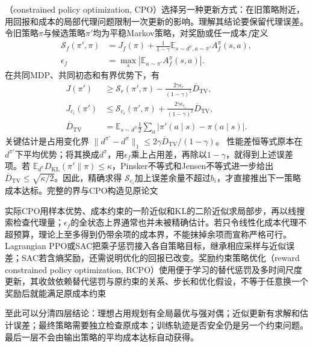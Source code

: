 （constrained policy optimization, CPO）选择另一种更新方式：在旧策略附近，用回报和成本的局部代理问题限制一次更新的影响。理解其结论要保留代理误差。令旧策略$\pi$与候选策略$\pi'$均为平稳Markov策略，对奖励或任一成本$f$定义
\[
  \begin{aligned}
    \mathcal S_f(\pi',\pi)
      &=J_f(\pi)+\frac{1}{1-\gamma}
          \mathbb E_{s\sim d^\pi,a\sim\pi'}A_f^\pi(s,a),\\
    \epsilon_f
      &=\max_s\left|\mathbb E_{a\sim\pi'}A_f^\pi(s,a)\right|.
  \end{aligned}
\]
在共同MDP、共同初态和有界优势下，有
\begin{align}
  J(\pi')&\geq\mathcal S_r(\pi',\pi)
      -\frac{2\gamma\epsilon_r}{(1-\gamma)^2}\overline D_{\mathrm{TV}},
      \nonumber\\
  J_{c_i}(\pi')&\leq\mathcal S_{c_i}(\pi',\pi)
      +\frac{2\gamma\epsilon_{c_i}}{(1-\gamma)^2}\overline D_{\mathrm{TV}},
  \label{eq:rl-trustworthy-cpo-bound}\\
  \overline D_{\mathrm{TV}}
    &=\mathbb E_{s\sim d^\pi}
          \frac12\sum_a|\pi'(a\mid s)-\pi(a\mid s)|. \nonumber
\end{align}
关键估计是占用变化界
$\|d^{\pi'}-d^\pi\|_1\leq
2\gamma\overline D_{\mathrm{TV}}/(1-\gamma)$。
性能差恒等式原本在$d^{\pi'}$下平均优势；将其换成$d^\pi$，用$\epsilon_f$乘上占用差，再除以$1-\gamma$，就得到上述误差项。若
$\mathbb E_{d^\pi}D_{\mathrm{KL}}(\pi'\|\pi)\leq\kappa$，Pinsker不等式和Jensen不等式进一步给出
$\overline D_{\mathrm{TV}}\leq\sqrt{\kappa/2}$。因此，精确求得
$\mathcal S_{c_i}$加上误差余量不超过$b_i$，才直接推出下一策略成本达标。完整的界与CPO构造见原论文

实际CPO用样本优势、成本约束的一阶近似和KL的二阶近似求局部步，再以线搜索检查代理量；$\epsilon_f$的全状态上界通常也并未被精确估计。若只令线性化成本代理不超预算，理论上至多得到仍带余项的成本界，不能抹掉余项而宣称严格可行。Lagrangian PPO或SAC把乘子惩罚接入各自策略目标，继承相应采样与近似误差；SAC若含熵奖励，还需说明优化的回报已改变。奖励约束策略优化（reward constrained policy optimization, RCPO）使用便于学习的替代惩罚及多时间尺度更新，其收敛依赖替代惩罚与原约束的关系、步长和优化假设，不等于任意换一个奖励后就能满足原成本约束

至此可以分清四层结论：理想占用规划有全局最优与强对偶；近似更新有求解和估计误差；最终策略需要独立检查原成本；训练轨迹是否安全仍是另一个约束问题。最后一层不会由输出策略的平均成本达标自动获得。

